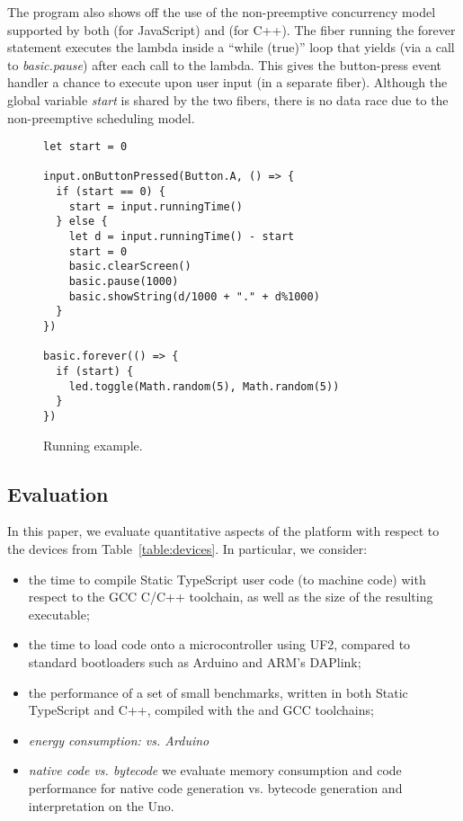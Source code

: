 The program also shows off the use of the non-preemptive concurrency
model supported by both \MC (for JavaScript) and \CO (for C++). 
The fiber running the forever statement executes the lambda inside a ``while (true)'' 
loop that yields (via a call to \emph{basic.pause}) after each call to the lambda.
This gives the button-press event handler a chance to execute
upon user input (in a separate fiber). Although the global variable \emph{start} is 
shared by the two fibers, there is no data race due to the non-preemptive 
scheduling model. 




\begin{figure}
\begin{lstlisting}
let start = 0

input.onButtonPressed(Button.A, () => {
  if (start == 0) {
    start = input.runningTime()
  } else {
    let d = input.runningTime() - start
    start = 0 
    basic.clearScreen()
    basic.pause(1000)
    basic.showString(d/1000 + "." + d%1000)
  }
})

basic.forever(() => {
  if (start) {
    led.toggle(Math.random(5), Math.random(5))
  }
})
\end{lstlisting}
\caption{\label{fig:example}Running example.}
\end{figure}

\subsection{Evaluation}

In this paper, we evaluate quantitative aspects of the platform
with respect to the devices from Table~\ref{table:devices}. In particular, we
consider:
\begin{itemize}
\item the time to compile Static TypeScript user code (to machine code) with respect
      to the GCC C/C++ toolchain, as well as the size of the resulting executable;
\item the time to load code onto a microcontroller using UF2, compared to standard bootloaders
      such as Arduino and ARM's DAPlink;
\item the performance of a set of small benchmarks, written in both Static TypeScript and C++,
      compiled with the \MC and GCC toolchains;
\item \emph{energy consumption: \CO vs. Arduino}
\item \emph{native code vs. bytecode} we
      evaluate memory consumption and code performance for native code generation
      vs. bytecode generation and interpretation on the Uno.
\end{itemize}


